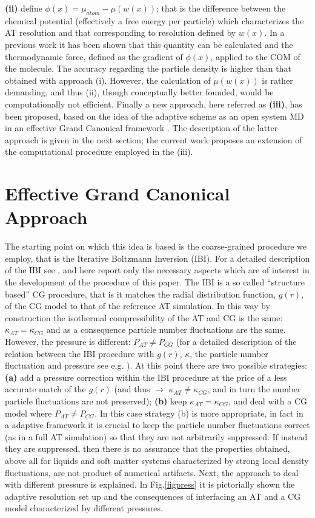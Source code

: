 \documentclass[aps,pre,preprint]{revtex4}
\begin{document}
{\bf (ii)} define $\phi(x)=\mu_{atom}-{\mu}{(w(x))}$; that is the difference between the chemical potential (effectively a free energy per particle) which characterizes the AT resolution and that corresponding to resolution defined by $w(x)$. In a previous work \cite{simon} it has been shown that this quantity can be calculated and the thermodynamic force, defined as the gradient of $\phi(x)$, applied to the COM of the molecule. The accuracy regarding the particle density is higher than that obtained with approach (i). However, the calculation of $\mu(w(x))$ is rather demanding, and thus (ii), though conceptually better founded, would be computationally not efficient. Finally a new approach, here referred as {\bf (iii)}, has been proposed, based on the idea of the adaptive scheme as an open system MD in an effective Grand Canonical framework \cite{prlgc}. The description of the latter approach is given in the next section; the current work proposes an extension of the computational procedure employed in the (iii).

\section{Effective Grand Canonical Approach}
The starting point on which this idea is based is the coarse-grained procedure we employ, that is the Iterative Boltzmann Inversion  (IBI). 
For a detailed description of the IBI see \cite{ibm}, and here report only the necessary aspects which are of interest in the development of the procedure of this paper.
The IBI is a so called ``structure based'' CG procedure, that is it matches the radial distribution function, $g(r)$, of the CG model to that of the reference AT simulation. In this way by construction the isothermal compressibility of the AT and CG is the same: $\kappa_{AT}=\kappa_{CG}$ and as a consequence particle number fluctuations are the same. However, the pressure is different: $P_{AT}\neq P_{CG}$  (for a detailed description of the relation between the IBI procedure with $g(r)$, $\kappa$, the particle number fluctuation and pressure see e.g. \cite{han}). At this point there are two possible strategies: {\bf (a)}  add a pressure correction within the IBI procedure at the price of a less accurate match of the $g(r)$ (and thus $\rightarrow$ $\kappa_{AT}\neq\kappa_{CG}$, and in turn the number particle fluctuations are not preserved); {\bf (b)} keep $\kappa_{AT}=\kappa_{CG}$, and deal with a CG model where $P_{AT}\neq P_{CG}$. In this case strategy (b) is more appropriate, in fact in a adaptive framework it is crucial to keep the particle number fluctuations correct (as in a full AT simulation) so that they are not arbitrarily suppressed. If instead they are suppressed, then there is no assurance that the properties obtained, above all for liquids and soft matter systems characterized by strong local density fluctuations, are not product of numerical artifacts. Next, the approach to deal with different pressure is explained. In Fig.\ref{figpress} it is pictorially shown the adaptive resolution set up and the consequences of interfacing an AT and a CG model characterized by different pressures. 
\end{document}
